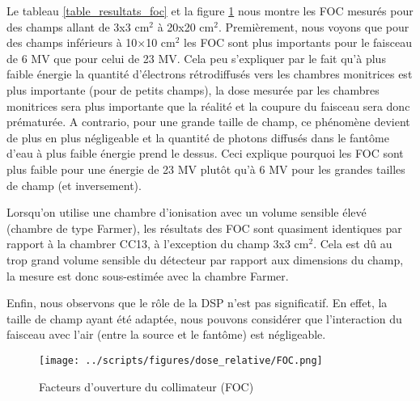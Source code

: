 \documentclass{article}
\begin{document}
Le tableau \ref*{table_resultats_foc} et la figure \ref*{fig_foc} nous montre les FOC mesurés pour des champs allant de 3x3 cm$^2$ à 20x20 cm$^2$. Premièrement, nous voyons que pour des champs inférieurs à 10$\times$10 cm$^2$ les FOC sont plus importants pour le faisceau de 6 MV que pour celui de 23 MV. Cela peu s'expliquer par le fait qu'à plus faible énergie la quantité d'électrons rétrodiffusés vers les chambres monitrices est plus importante (pour de petits champs), la dose mesurée par les chambres monitrices sera plus importante que la réalité et la coupure du faisceau sera donc prématurée. A contrario, pour une grande taille de champ, ce phénomène devient de plus en plus négligeable et la quantité de photons diffusés dans le fantôme d'eau à plus faible énergie prend le dessus. Ceci explique pourquoi les FOC sont plus faible pour une énergie de 23 MV plutôt qu'à 6 MV pour les grandes tailles de champ (et inversement).

Lorsqu'on utilise une chambre d'ionisation avec un volume sensible élevé (chambre de type Farmer), les résultats des FOC sont quasiment identiques par rapport à la chambrer CC13, à l'exception du champ 3x3 cm$^2$. Cela est dû au trop grand volume sensible du détecteur par rapport aux dimensions du champ, la mesure est donc sous-estimée avec la chambre Farmer.

Enfin,  nous observons que le rôle de la DSP n'est pas significatif. En effet, la taille de champ ayant été adaptée, nous pouvons considérer que l'interaction du faisceau avec l'air (entre la source et le fantôme) est négligeable.

\begin{figure}[h]
  \centering
  \texttt{[image: ../scripts/figures/dose\_relative/FOC.png]}
  \caption{Facteurs d'ouverture du collimateur (FOC)}
  \label{fig_foc}
\end{figure}
\end{document}
